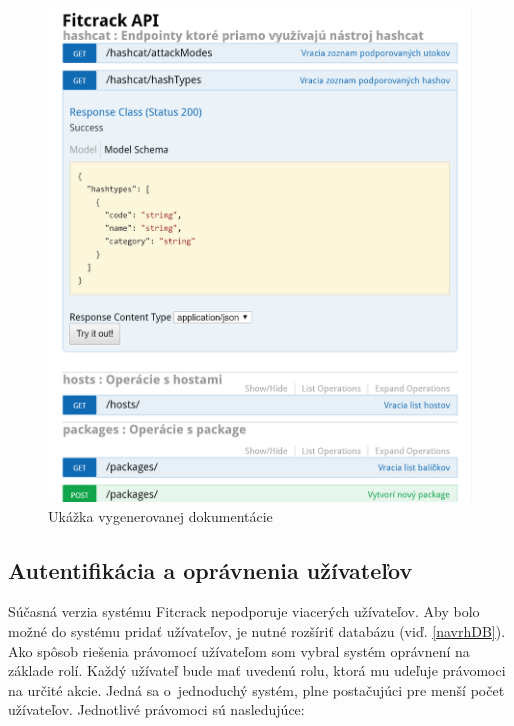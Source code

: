 \documentclass[slovak]{fitthesis}
\begin{document}
\begin{figure}[H]
    \centering
    \includegraphics[scale=0.45]{obrazky/doc.PNG}
    \caption{Ukážka vygenerovanej dokumentácie}
    \label{fig:doc}
\end{figure}

\subsection{Autentifikácia a oprávnenia užívateľov}
Súčasná verzia systému Fitcrack nepodporuje viacerých užívateľov. Aby bolo možné do systému pridať užívateľov, je nutné rozšíriť databázu (viď. \ref{navrhDB}). Ako spôsob riešenia právomocí užívateľom som vybral systém oprávnení na základe rolí. Každý užívateľ bude mať uvedenú rolu, ktorá mu udeľuje právomoci na určité akcie. Jedná sa o~jednoduchý systém, plne postačujúci pre menší počet užívateľov. Jednotlivé právomoci sú nasledujúce:
\end{document}
